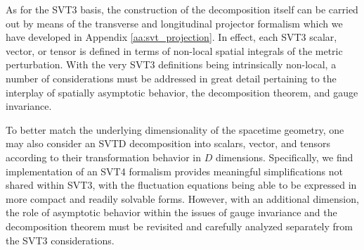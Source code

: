 As for the SVT3 basis, the construction of the decomposition itself can be carried out by means of the transverse and longitudinal projector formalism which we have developed in Appendix \ref{aa:svt_projection}. In effect, each SVT3 scalar, vector, or tensor is defined in terms of non-local spatial integrals of the metric perturbation. With the very SVT3 definitions being intrinsically non-local, a number of considerations must be addressed in great detail pertaining to the interplay of spatially asymptotic behavior, the decomposition theorem, and gauge invariance. 

To better match the underlying dimensionality of the spacetime geometry, one may also consider an SVTD decomposition into scalars, vector, and tensors according to their transformation behavior in $D$ dimensions. Specifically, we find implementation of an SVT4 formalism provides meaningful simplifications not shared within SVT3, with the fluctuation equations being able to be expressed in more compact and readily solvable forms. However, with an additional dimension, the role of asymptotic behavior within the issues of gauge invariance and the decomposition theorem must be revisited and carefully analyzed separately from the SVT3 considerations. 

